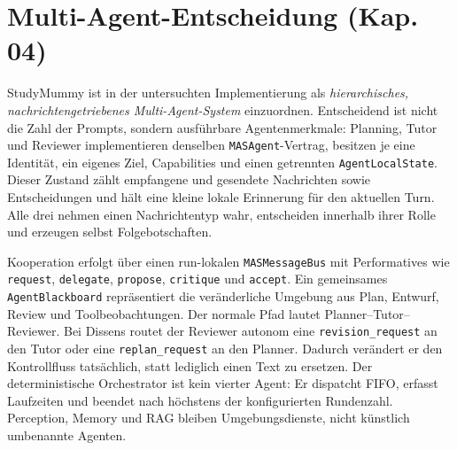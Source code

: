 \section{Multi-Agent-Entscheidung (Kap. 04)}
\label{sec:multi-agent}

StudyMummy ist in der untersuchten Implementierung als \emph{hierarchisches,
nachrichtengetriebenes Multi-Agent-System} einzuordnen. Entscheidend ist nicht
die Zahl der Prompts, sondern ausführbare Agentenmerkmale: Planning, Tutor und
Reviewer implementieren denselben \texttt{MASAgent}-Vertrag, besitzen je eine
Identität, ein eigenes Ziel, Capabilities und einen getrennten
\texttt{AgentLocalState}. Dieser Zustand zählt empfangene und gesendete
Nachrichten sowie Entscheidungen und hält eine kleine lokale Erinnerung für
den aktuellen Turn. Alle drei nehmen einen Nachrichtentyp wahr, entscheiden
innerhalb ihrer Rolle und erzeugen selbst Folgebotschaften.

Kooperation erfolgt über einen run-lokalen \texttt{MASMessageBus} mit
Performatives wie \texttt{request}, \texttt{delegate}, \texttt{propose},
\texttt{critique} und \texttt{accept}. Ein gemeinsames
\texttt{AgentBlackboard} repräsentiert die veränderliche Umgebung aus Plan,
Entwurf, Review und Toolbeobachtungen. Der normale Pfad lautet Planner--Tutor--Reviewer.
Bei Dissens routet der Reviewer autonom eine \texttt{revision\_request} an den
Tutor oder eine \texttt{replan\_request} an den Planner. Dadurch verändert er
den Kontrollfluss tatsächlich, statt lediglich einen Text zu ersetzen. Der
deterministische Orchestrator ist kein vierter Agent: Er dispatcht FIFO,
erfasst Laufzeiten und beendet nach höchstens der konfigurierten Rundenzahl.
Perception, Memory und RAG bleiben Umgebungsdienste, nicht künstlich
umbenannte Agenten.

